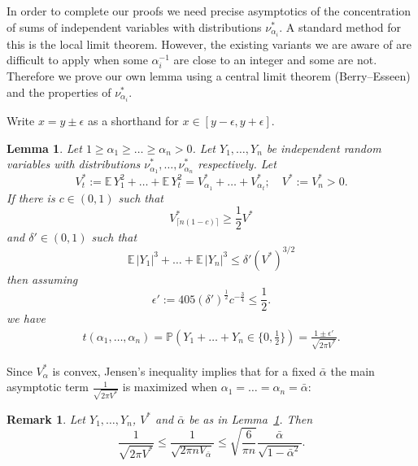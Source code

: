 \documentclass{article}
\newtheorem{lemma} [theorem] {Lemma}\newtheorem{attempt} [theorem] {Attempt}\newtheorem{corollary} [theorem] {Corollary}\newtheorem{prop} [theorem] {Proposition}\newtheorem{definition} [theorem] {Definition}\newtheorem{remark} [theorem] {Remark}\newtheorem{conjecture} [theorem] {Conjecture}\newtheorem{claim} [theorem] {Claim}
\def\E{{\mathbb E}\,}
\newcommand{\pr}{\mathbb P}
\newcommand\nuopt[1]{\nu_{#1}^*}
\begin{document}
In order to complete our proofs we need precise asymptotics of the concentration of sums of independent variables with distributions $\nuopt{\alpha_i}$. A standard method for this is the local limit theorem. However, the existing variants we are aware of are difficult to apply when some $\alpha_i^{-1}$ are close to an integer and some are not. Therefore we prove our own lemma using a central limit theorem (Berry--Esseen) and the properties of $\nuopt{\alpha_i}$.

Write $x = y \pm \epsilon$ as a shorthand for $x \in [y-\epsilon, y+\epsilon]$.
\begin{lemma} \label{lem.clt}
    Let $1 \ge \alpha_1 \ge \dots \ge \alpha_n > 0$.
    Let $Y_1, \dots, Y_n$ be independent random variables with distributions $\nu^*_{\alpha_1}, \dots, \nu^*_{\alpha_n}$ respectively. Let
    \[
        V_t^* := \E Y_1^2 + \dots + \E Y_t^2 = V_{\alpha_1}^* + \dots + V_{\alpha_t}^*; \quad V^* := V_n^* > 0.
    \]
    If there is $c \in (0,1)$ such that
    \begin{equation}\label{eq.cVstar}
        V_{\lceil n(1-c) \rceil}^* \ge \frac 1 2 V^*
    \end{equation}
    and $\delta' \in (0,1)$ such that
    \begin{equation}\label{eq.berryesseen}
        \E |Y_1|^3 + \dots + \E |Y_n|^3 \le \delta' (V^*)^{3/2}
    \end{equation}
    then assuming
    \begin{equation}\label{eq.clt_eps}
\epsilon' := 405 (\delta')^{\frac 1 2} c^{-\frac 3 4} \le \frac 1 2.
    \end{equation}
    we have
    \begin{align*}
        t(\alpha_1, \dots, \alpha_n) = \pr(Y_1 + \dots + Y_n \in \{0, \frac 1 2\}) = \frac {1 \pm \epsilon'} {\sqrt {2 \pi V^*}}.
    \end{align*}
\end{lemma}
Since $V_{\alpha}^*$ is convex, Jensen's inequality implies that for a fixed $\bar{\alpha}$ the main asymptotic term $\frac 1 {\sqrt{2 \pi V^*}}$
is maximized when $\alpha_1=\dots= \alpha_n = \bar{\alpha}$: \begin{remark}\label{rmk.explicit_bound}
    Let $Y_1, \dots, Y_n$, $V^*$ and $\bar{\alpha}$ be as in Lemma~\ref{lem.clt}. Then
\[
        \frac 1 {\sqrt {2 \pi V^*}} \le  \frac 1 {\sqrt {2 \pi n V_{\bar{\alpha}}}} \le \sqrt {\frac 6 {\pi n}}  \frac {\bar{\alpha}} {\sqrt{ 1 - \bar{\alpha}^2}}.
    \]
\end{remark}
\end{document}
